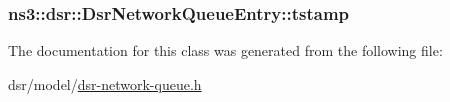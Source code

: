 \subsubsection[{\texorpdfstring{tstamp}{tstamp}}]{ ns3\+::dsr\+::\+Dsr\+Network\+Queue\+Entry\+::tstamp\hspace{0.3cm}{\ttfamily [private]}}\hypertarget{classns3_1_1dsr_1_1DsrNetworkQueueEntry_afd3a4e2dfc3922f590ad1fdf6b3a12c9}{}\label{classns3_1_1dsr_1_1DsrNetworkQueueEntry_afd3a4e2dfc3922f590ad1fdf6b3a12c9}


The documentation for this class was generated from the following file\+:\begin{DoxyCompactItemize}
\item 
dsr/model/\hyperlink{dsr-network-queue_8h}{dsr-\/network-\/queue.\+h}\end{DoxyCompactItemize}
